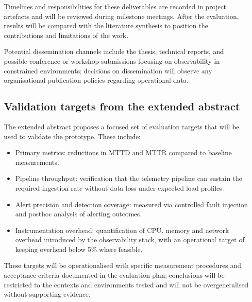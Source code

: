 Timelines and responsibilities for these deliverables are recorded in project artefacts and will be reviewed during milestone meetings. After the evaluation, results will be compared with the literature synthesis to position the contributions and limitations of the work.

Potential dissemination channels include the thesis, technical reports, and possible conference or workshop submissions focusing on observability in constrained environments; decisions on dissemination will observe any organisational publication policies regarding operational data.

\subsection{Validation targets from the extended abstract}
The extended abstract proposes a focused set of evaluation targets that will be used to validate the prototype. These include:
\begin{itemize}
	\item Primary metrics: reductions in \ac{MTTD} and \ac{MTTR} compared to baseline measurements.
	\item Pipeline throughput: verification that the telemetry pipeline can sustain the required ingestion rate without data loss under expected load profiles.
	\item Alert precision and detection coverage: measured via controlled fault injection and post\-hoc analysis of alerting outcomes.
	\item Instrumentation overhead: quantification of CPU, memory and network overhead introduced by the observability stack, with an operational target of keeping overhead below 5\% where feasible.
\end{itemize}

These targets will be operationalised with specific measurement procedures and acceptance criteria documented in the evaluation plan; conclusions will be restricted to the contexts and environments tested and will not be overgeneralised without supporting evidence.

